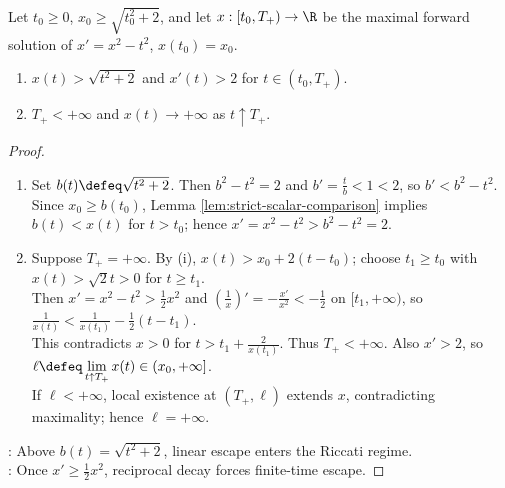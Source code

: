 \begin{proposition} \label{prop:riccati-upper-isocline-blowup} \\
Let $t_0\geq0$, $x_0\geq\sqrt{t_0^2+2}$, and let $x:[t_0,T_+)\to\R$ be the maximal forward solution of $x'=x^2-t^2$, $x(t_0)=x_0$.
\begin{enumerate}[label=(\roman*)]
\setlength{\itemsep}{0pt}
\item $x(t)>\sqrt{t^2+2}$ and $x'(t)>2$ for $t\in(t_0,T_+)$.
\item $T_+<+\infty$ and $x(t)\to+\infty$ as $t\uparrow T_+$.
\end{enumerate}
\begin{proof}
\begin{enumerate}[label=(\roman*)]
\setlength{\itemsep}{0pt}
\item Set $b(t)\defeq\sqrt{t^2+2}$. Then $b^2-t^2=2$ and $b'=\frac{t}{b}<1<2$, so $b'<b^2-t^2$.\\
Since $x_0\geq b(t_0)$, Lemma \ref{lem:strict-scalar-comparison} implies $b(t)<x(t)$ for $t>t_0$; hence $x'=x^2-t^2>b^2-t^2=2$.
\item Suppose $T_+=+\infty$. By (i), $x(t)>x_0+2(t-t_0)$; choose $t_1\geq t_0$ with $x(t)>\sqrt{2}t>0$ for $t\geq t_1$.\\
Then $x'=x^2-t^2>\frac12x^2$ and $(\frac{1}{x})'=-\frac{x'}{x^2}<-\frac12$ on $[t_1,+\infty)$, so $\frac{1}{x(t)}<\frac{1}{x(t_1)}-\frac12(t-t_1)$.\\
This contradicts $x>0$ for $t>t_1+\frac{2}{x(t_1)}$. Thus $T_+<+\infty$. Also $x'>2$, so $\ell\defeq\lim\limits_{t\uparrow T_+}x(t)\in(x_0,+\infty]$.\\
If $\ell<+\infty$, local existence at $(T_+,\ell)$ extends $x$, contradicting maximality; hence $\ell=+\infty$.
\end{enumerate}
: Above $b(t)=\sqrt{t^2+2}$, linear escape enters the Riccati regime.\\
: Once $x'\geq\frac12x^2$, reciprocal decay forces finite-time escape.
\end{proof}
\end{proposition}

